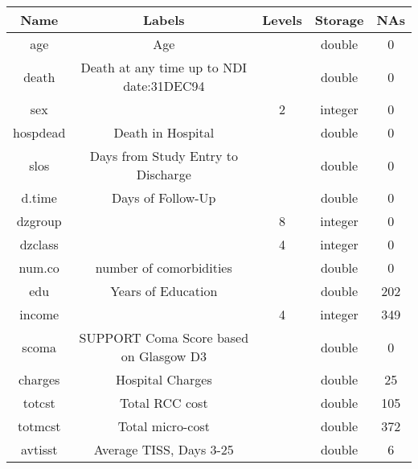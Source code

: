 \documentclass[
]{jss}
\begin{document}
\begin{table}[]
\centering
\begin{tabular}{ccccc}
\hline
\textbf{Name} & \textbf{Labels}                          & \textbf{Levels} & \textbf{Storage} & \textbf{NAs} \\
\hline
age           & Age                                      &                 & double           & 0            \\
death         & Death at any time up to NDI date:31DEC94 &                 & double           & 0            \\
sex           &                                          & 2               & integer          & 0            \\
hospdead      & Death in Hospital                        &                 & double           & 0            \\
slos          & Days from Study Entry to Discharge       &                 & double           & 0            \\
d.time        & Days of Follow-Up                        &                 & double           & 0            \\
dzgroup       &                                          & 8               & integer          & 0            \\
dzclass       &                                          & 4               & integer          & 0            \\
num.co        & number of comorbidities                  &                 & double           & 0            \\
edu           & Years of Education                       &                 & double           & 202          \\
income        &                                          & 4               & integer          & 349          \\
scoma         & SUPPORT Coma Score based on Glasgow D3   &                 & double           & 0            \\
charges       & Hospital Charges                         &                 & double           & 25           \\
totcst        & Total RCC cost                           &                 & double           & 105          \\
totmcst       & Total micro-cost                         &                 & double           & 372          \\
avtisst       & Average TISS, Days 3-25                  &                 & double           & 6            \\

\end{tabular}
\end{table}
\end{document}
